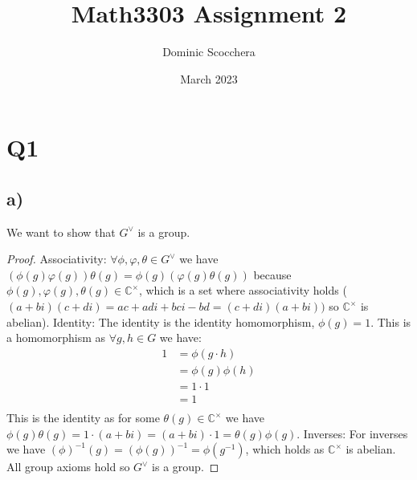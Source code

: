 \documentclass{article}
\title{Math3303 Assignment 2}
\author{Dominic Scocchera}
\date{March 2023}
\begin{document}
\maketitle
\section*{Q1}
\subsection*{a)}
We want to show that $G^\vee$ is a group.
\begin{proof}
Associativity:
\newline
$\forall\phi,\varphi,\theta\in G^\vee$ we have $(\phi(g)\varphi(g))\theta(g)=\phi(g)(\varphi(g)\theta(g))$ because $\phi(g),\varphi(g),\theta(g)\in \mathbb{C}^{\times}$, which is a set where associativity holds ($(a+bi)(c+di)=ac+adi+bci-bd=(c+di)(a+bi))$ so $\mathbb{C}^{\times}$ is abelian).
\newline\newline
Identity:
\newline
The identity is the identity homomorphism, $\phi(g)=1$. This is a homomorphism as $\forall g,h\in G$ we have:
\begin{align*}
1&=\phi(g\cdot h)\\
&=\phi(g)\phi(h)\\
&=1\cdot1\\
&=1\\
\end{align*}
This is the identity as for some $\theta(g)\in\mathbb{C}^{\times}$ we have $\phi(g)\theta(g)=1\cdot(a+bi)=(a+bi)\cdot1=\theta(g)\phi(g)$.
\newline\newline
Inverses:
For inverses we have $(\phi)^{-1}(g)=(\phi(g))^{-1}=\phi(g^{-1})$, which holds as $\mathbb{C}^{\times}$ is abelian.
\newline\newline
All group axioms hold so $G^\vee$ is a group.
\end{proof}
\end{document}
